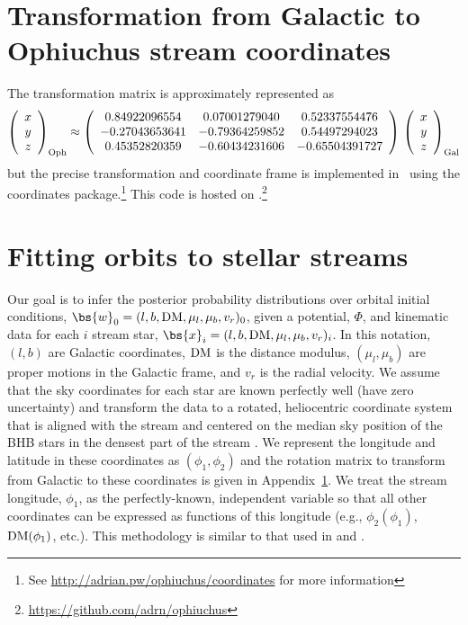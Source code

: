 \documentclass[numberedappendix]{emulateapj}
\newcommand{\DM}{{\rm DM}}
\begin{document}
\section{Transformation from Galactic to Ophiuchus stream coordinates} \label{sec:rotationmatrix}
The transformation matrix is approximately represented as
\begin{equation*}
\left( \begin{array}{c}
x \\
y \\
z \end{array} \right)_{\rm Oph} \approx
\left( \begin{array}{ccc}
0.84922096554 & 0.07001279040 & 0.52337554476\\
-0.27043653641 & -0.79364259852 &  0.54497294023\\
0.45352820359 & -0.60434231606 & -0.65504391727
\end{array} \right) \,
\left( \begin{array}{c}
x \\
y \\
z \end{array} \right)_{\rm Gal}
\end{equation*}
but the precise transformation and coordinate frame is implemented in \python\ using the  coordinates package.\footnote{See \url{http://adrian.pw/ophiuchus/coordinates} for more information}  This code is hosted on .\footnote{\url{https://github.com/adrn/ophiuchus}} 

\section{Fitting orbits to stellar streams}\label{sec:orbitfit}

Our goal is to infer the posterior probability distributions over orbital initial conditions, $\bs{w}_0=(l, b, \DM, \mu_l, \mu_b, v_r)_0$, given a potential, $\Phi$, and kinematic data for each $i$ stream star, $\bs{x}_i=(l, b, \DM, \mu_l, \mu_b, v_r)_i$. In this notation, $(l, b)$ are Galactic coordinates, $\DM$ is the distance modulus, $(\mu_l, \mu_b)$ are proper motions in the Galactic frame, and $v_r$ is the radial velocity. We assume that the sky coordinates for each star are known perfectly well (have zero uncertainty) and transform the data to a rotated, heliocentric coordinate system that is aligned with the stream and centered on the median sky position of the BHB stars in the densest part of the stream \cite[all BHB stars except the `fanned' stars: cand15, cand26, cand49, cand54 from][]{sesar16}. We represent the longitude and latitude in these coordinates as $(\phi_1, \phi_2)$ and the rotation matrix to transform from Galactic to these coordinates is given in Appendix~\ref{sec:rotationmatrix}. We treat the stream longitude, $\phi_1$, as the perfectly-known, independent variable so that all other coordinates can be expressed as functions of this longitude (e.g., $\phi_2(\phi_1)$, ${\rm DM}(\phi_1)$, etc.). This methodology is similar to that used in \cite{koposov10} and \cite{sesar15a}.
\end{document}
